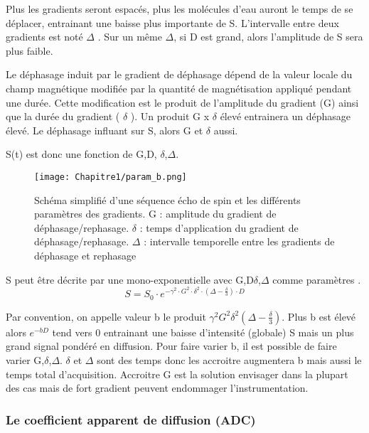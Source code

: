 Plus les gradients seront espacés, plus les molécules d’eau auront le temps de se déplacer, entrainant une baisse plus importante de S. L’intervalle entre deux gradients est noté $\Delta$ . Sur un même $\Delta$, si D est grand, alors l’amplitude de S sera plus faible.

Le déphasage induit par le gradient de déphasage dépend de la valeur locale du champ magnétique modifiée par la quantité de magnétisation appliqué pendant une durée. Cette modification est le produit de l’amplitude du gradient (G) ainsi que la durée du gradient ( $\delta$ ). Un produit G x $\delta$ élevé entrainera un déphasage élevé. Le déphasage influant sur S, alors G et $\delta$ aussi.

S(t) est donc une fonction de G,D, $\delta$,$\Delta$.

\begin{figure}[!htbp]
  \begin{center}
    \texttt{[image: Chapitre1/param\_b.png]}
     \end{center}
    \caption{Schéma simplifié d’une séquence écho de spin et les différents paramètres des gradients. G : amplitude du gradient de déphasage/rephasage. $\delta$ : temps d’application du gradient de déphasage/rephasage. $\Delta$ : intervalle temporelle entre les gradients de déphasage et rephasage}
  \label{fig:param_b}
\end{figure}

S peut être décrite par une mono-exponentielle avec G,D$\delta$,$\Delta$ comme paramètres \cite{2014_2}.
\begin{equation}
\nonumber
S= S_0 \cdot e^{-\gamma^2 \cdot G^2 \cdot\delta ^2 \cdot (\Delta-\frac{\delta}{3}) \cdot D}
\end{equation}

Par convention, on appelle valeur b le produit $\gamma^2G^2\delta^2 (\Delta -\frac{\delta}{3})$. Plus b est élevé alors $e^{-bD}$ tend vers 0 entrainant une baisse d’intensité (globale) S mais un plus grand signal pondéré en diffusion. Pour faire varier b, il est possible de faire varier G,$\delta$,$\Delta$. $\delta$ et $\Delta$ sont des temps donc les accroitre augmentera b mais aussi le temps total d’acquisition.  Accroitre G est la solution envisager dans la plupart des cas mais de fort gradient peuvent endommager l’instrumentation.

\subsubsection{Le coefficient apparent de diffusion (ADC)}

